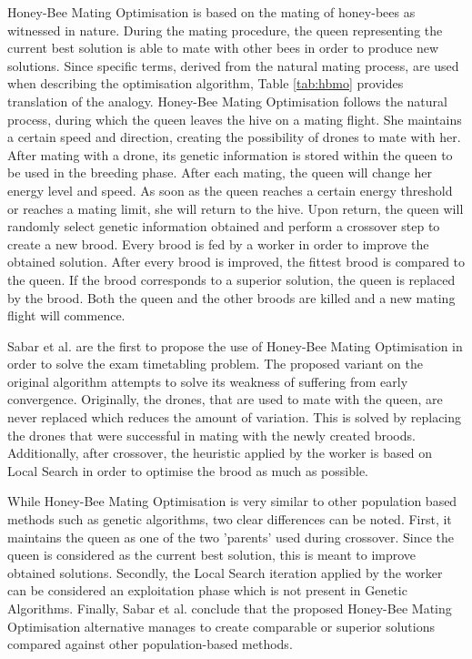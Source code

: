 Honey-Bee Mating Optimisation \cite{abbas2001} is based on the mating of honey-bees as witnessed in nature. During the mating procedure, the queen representing the current best solution is able to mate with other bees in order to produce new solutions. Since specific terms, derived from the natural mating process, are used when describing the optimisation algorithm, Table \ref{tab:hbmo} provides translation of the analogy. Honey-Bee Mating Optimisation follows the natural process, during which the queen leaves the hive on a mating flight. She maintains a certain speed and direction, creating the possibility of drones to mate with her. After mating with a drone, its genetic information is stored within the queen to be used in the breeding phase. After each mating, the queen will change her energy level and speed. As soon as the queen reaches a certain energy threshold or reaches a mating limit, she will return to the hive. Upon return, the queen will randomly select genetic information obtained and perform a crossover step to create a new brood. Every brood is fed by a worker in order to improve the obtained solution. After every brood is improved, the fittest brood is compared to the queen. If the brood corresponds to a superior solution, the queen is replaced by the brood. Both the queen and the other broods are killed and a new mating flight will commence. 

Sabar et al. \cite{Sabar2009} are the first to propose the use of Honey-Bee Mating Optimisation in order to solve the exam timetabling problem. The proposed variant on the original algorithm \cite{abbas2001} attempts to solve its weakness of suffering from early convergence. Originally, the drones, that are used to mate with the queen, are never replaced which reduces the amount of variation. This is solved by replacing the drones that were successful in mating with the newly created broods. Additionally, after crossover, the heuristic applied by the worker is based on Local Search in order to optimise the brood as much as possible.

While Honey-Bee Mating Optimisation is very similar to other population based methods such as genetic algorithms, two clear differences can be noted. First, it maintains the queen as one of the two 'parents' used during crossover. Since the queen is considered as the current best solution, this is meant to improve obtained solutions. Secondly, the Local Search iteration applied by the worker can be considered an exploitation phase which is not present in Genetic Algorithms. Finally, Sabar et al. conclude that the proposed Honey-Bee Mating Optimisation alternative manages to create comparable or superior solutions compared against other population-based methods.

